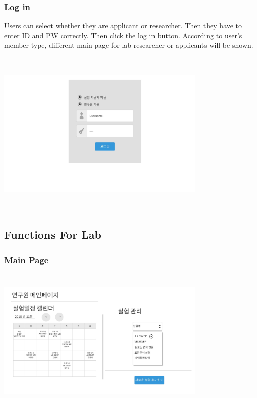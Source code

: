 \documentclass[letterpaper, 10 pt, conference]{ieeeconf}  %
\begin{document}
\subsubsection{Log in}
Users can select whether they are applicant or researcher. Then they have to enter ID and PW correctly. Then click the log in button. According to user's member type, different main page for lab researcher or applicants will be shown.\\
\includegraphics[width=10cm,height = 8cm]{Oven/02_signin}


\subsection{Functions For Lab}
\subsubsection{Main Page\\}
\includegraphics[width=10cm,height = 7cm]{Oven_ver2/ver2]06_labMainPage.jpg}
\end{document}
